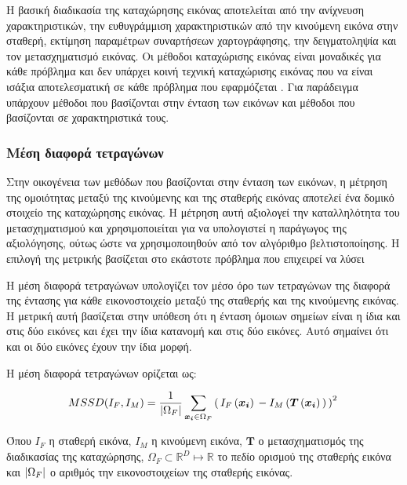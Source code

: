 \documentclass[a4paper,12pt]{article}
\DeclarePairedDelimiter\abs{\lvert}{\rvert}
\newcommand{\R}{\mathbb{R}}
\begin{document}

Η βασική διαδικασία της καταχώρησης εικόνας αποτελείται από την ανίχνευση
χαρακτηριστικών, την ευθυγράμμιση χαρακτηριστικών από την κινούμενη εικόνα στην
σταθερή, εκτίμηση παραμέτρων συναρτήσεων χαρτογράφησης, την δειγματοληψία και
τον μετασχηματισμό εικόνας. Οι μέθοδοι καταχώρισης εικόνας είναι μοναδικές για
κάθε πρόβλημα και δεν υπάρχει κοινή τεχνική καταχώρισης εικόνας που να είναι
ισάξια αποτελεσματική σε κάθε πρόβλημα που εφαρμόζεται \cite{Registration:2}.
Για παράδειγμα υπάρχουν μέθοδοι που βασίζονται στην ένταση των εικόνων και
μέθοδοι που βασίζονται σε χαρακτηριστικά τους.


\subsubsection{Μέση διαφορά τετραγώνων} \label{MSSD}

Στην οικογένεια των μεθόδων που βασίζονται στην ένταση των εικόνων, η μέτρηση
της ομοιότητας μεταξύ της κινούμενης και της σταθερής εικόνας αποτελεί ένα
δομικό στοιχείο της καταχώρησης εικόνας. Η μέτρηση αυτή αξιολογεί την
καταλληλότητα του μετασχηματισμού και χρησιμοποιείται για να υπολογιστεί η
παράγωγος της αξιολόγησης, ούτως ώστε να χρησιμοποιηθούν από τον αλγόριθμο
βελτιστοποίησης. Η επιλογή της μετρικής βασίζεται στο εκάστοτε πρόβλημα που
επιχειρεί να λύσει

Η μέση διαφορά τετραγώνων υπολογίζει τον μέσο όρο των τετραγώνων της διαφορά της
έντασης για κάθε εικονοστοιχείο μεταξύ της σταθερής και της κινούμενης εικόνας.
Η μετρική αυτή βασίζεται στην υπόθεση ότι η ένταση όμοιων σημείων είναι η ίδια
και στις δύο εικόνες και έχει την ίδια κατανομή και στις δύο εικόνες. Αυτό
σημαίνει ότι και οι δύο εικόνες έχουν την ίδια μορφή. 

Η μέση διαφορά τετραγώνων ορίζεται ως:

\begin{equation*}
    MSSD(I_F, I_M) = \frac {1} {\abs{\Omega_F}} \sum_{\bm{x_i} \in \Omega_F} 
        \left(\, {I_F\left(\bm{x_i}\right)\, - 
                  I_M\left(\bm{T}\left(\bm{x_i}\right)\,\right)\,}
        \right)^2\, 
\end{equation*}

Όπου $I_F$ η σταθερή εικόνα, $I_M$ η κινούμενη εικόνα, $\bm{T}$ ο
μετασχηματισμός της διαδικασίας της καταχώρησης, $\Omega_F \subset \R^D \mapsto
\R$ το πεδίο ορισμού της σταθερής εικόνα και $\abs{\Omega_F}$ ο αριθμός την
εικονοστοιχείων της σταθερής εικόνας.
\end{document}
